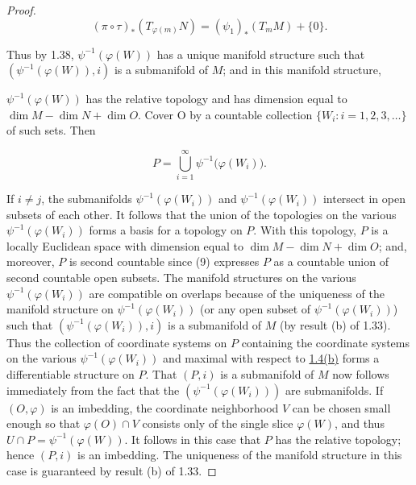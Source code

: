 \begin{proof}
	\[
		(\pi\circ\tau)_{*}(T_{\varphi(m)} N)=(\psi_{1})_{*}(T_{m} M)+\{0\}.
	\]

	Thus by 1.38,  $ \psi^{-1}(\varphi(W)) $ has a unique manifold structure such that  $ (\psi^{-1}(\varphi(W)), i) $ is a submanifold of  $ M $; and in this manifold structure,

	$ \psi^{-1}\left(\varphi(W)\right) $ has the relative topology and has dimension equal to  $ \dim M - \dim N + \dim O $. Cover O by a countable collection  $ \{W_i: i = 1, 2, 3, \ldots\} $ of such sets. Then

	\begin{equation}
		\tag{9}\label{eq:1.39:9}
		P=\bigcup_{i=1}^{\infty}\psi^{-1}\bigl(\varphi(W_{i})\bigr).
	\end{equation}

	If $i \neq j$, the submanifolds $\psi^{-1}(\varphi(W_i))$ and $\psi^{-1}(\varphi(W_i))$ intersect in open subsets of each other. It follows that the union of the topologies on the various $\psi^{-1}(\varphi(W_i))$ forms a basis for a topology on $P$. With this topology, $P$ is a locally Euclidean space with dimension equal to $\dim M - \dim N + \dim O$; and, moreover, $P$ is second countable since (9) expresses $P$ as a countable union of second countable open subsets. The manifold structures on the various $\psi^{-1}(\varphi(W_i))$ are compatible on overlaps because of the uniqueness of the manifold structure on $\psi^{-1}(\varphi(W_i))$ (or any open subset of $\psi^{-1}(\varphi(W_i))$) such that $(\psi^{-1}(\varphi(W_i)),i)$ is a submanifold of $M$ (by result (b) of 1.33). Thus the collection of coordinate systems on $P$ containing the coordinate systems on the various $\psi^{-1}(\varphi(W_i))$ and maximal with respect to \hyperref[thm:1.4]{1.4(b)} forms a differentiable structure on $P$. That $(P,i)$ is a submanifold of $M$ now follows immediately from the fact that the $(\psi^{-1}(\varphi(W_i)))$ are submanifolds. If $(O, \varphi)$ is an imbedding, the coordinate neighborhood $V$ can be chosen small enough so that $\varphi(O) \cap V$ consists only of the single slice $\varphi(W)$, and thus $U \cap P = \psi^{-1}(\varphi(W))$. It follows in this case that $P$ has the relative topology; hence $(P,i)$ is an imbedding. The uniqueness of the manifold structure in this case is guaranteed by result (b) of 1.33.

\end{proof}

